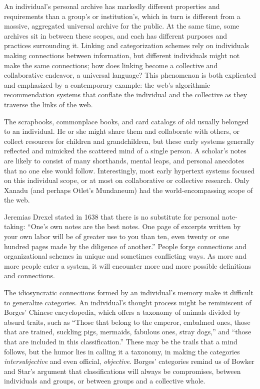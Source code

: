 An individual's personal archive has markedly different properties and requirements than a group's or institution's, which in turn is different from a massive, aggregated universal archive for the public. At the same time, some archives sit in between these scopes, and each has different purposes and practices surrounding it. Linking and categorization schemes rely on individuals making connections between information, but different individuals might not make the same connections; how does linking become a collective and collaborative endeavor, a universal language? This phenomenon is both explicated and emphasized by a contemporary example: the web's algorithmic recommendation systems that conflate the individual and the collective as they traverse the links of the web.

The scrapbooks, commonplace books, and card catalogs of old usually belonged to an individual. He or she might share them and collaborate with others, or collect resources for children and grandchildren, but these early systems generally reflected and mimicked the scattered mind of a single person. A scholar's notes are likely to consist of many shorthands, mental leaps, and personal anecdotes that no one else would follow. Interestingly, most early hypertext systems focused on this individual scope, or at most on collaborative or collective research. Only Xanadu (and perhaps Otlet's Mundaneum) had the world-encompassing scope of the web.

Jeremias Drexel stated in 1638 that there is no substitute for personal note-taking: ``One's own notes are the best notes. One page of excerpts written by your own labor will be of greater use to you than ten, even twenty or one hundred pages made by the diligence of another.''\autocite{blair_note_2004} People forge connections and organizational schemes in unique and sometimes conflicting ways. As more and more people enter a system, it will encounter more and more possible definitions and connections.

The idiosyncratic connections formed by an individual's memory make it difficult to generalize categories. An individual's thought process might be reminiscent of Borges' Chinese encyclopedia, which offers a taxonomy of animals divided by absurd traits, such as ``Those that belong to the emperor, embalmed ones, those that are trained, suckling pigs, mermaids, fabulous ones, stray dogs,'' and ``those that are included in this classification.''\autocite{borges_analytical_1993} These may be the trails that a mind follows, but the humor lies in calling it a taxonomy, in making the categories \emph{intersubjective} and even official, \emph{objective}. Borges' categories remind us of Bowker and Star's argument that classifications will always be compromises, between individuals and groups, or between groups and a collective whole.


